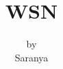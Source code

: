 \documentclass[12pt]{beamer}
\author[Saranya devi]{by  \\[1cm] Saranya}
\title{WSN}
\begin{document}
	
	\begin{frame}
		\frametitle{}
	\end{frame}
\end{document}
